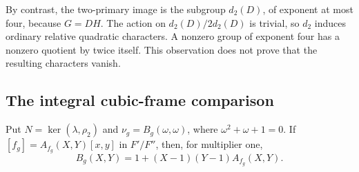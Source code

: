 By contrast, the two-primary image is the subgroup $d_2(D)$, of
exponent at most four, because $G=DH$. The action on
$d_2(D)/2d_2(D)$ is trivial, so $d_2$ induces ordinary relative
quadratic characters. A nonzero group of exponent four has a nonzero
quotient by twice itself. This observation does not prove that the
resulting characters vanish.

\subsection{The integral cubic-frame comparison}

Put $N=\ker(\lambda,\rho_2)$ and $\nu_g=B_g(\omega,\omega)$,
where $\omega^2+\omega+1=0$. If
$[f_g]=A_{f_g}(X,Y)[x,y]$ in $F'/F''$, then, for multiplier one,
\[
 B_g(X,Y)=1+(X-1)(Y-1)A_{f_g}(X,Y).
\]

